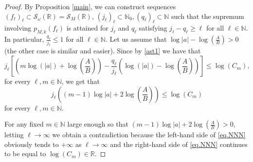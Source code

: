 \documentclass[12pt,reqno]{amsart} %
\numberwithin{equation}{section}
\begin{document}
\begin{proof}
					By Proposition \eqref{main}, we can construct sequences $(f_\ell)_\ell\subset \mathcal{S}_{\omega}(\mathbb{R})=\mathcal{S}_M(\mathbb{R})$, $(j_\ell)_\ell\subset \mathbb{N}_0, (q_\ell)_\ell\subset\mathbb{N}$ such that the supremum involving $p_{M,k}(f_\ell)$ is attained for $j_\ell$ and $q_\ell$ satisfying $j_\ell-q_\ell\geq \ell$ for all $\ell\in\mathbb{N}$. In particular, $\frac{q_\ell}{j_\ell}\leq 1$ for all $\ell\in\mathbb{N}$. Let us assume that $\log|a|-\log\left(\frac{A}{B}\right)>0$ (the other case is similar and easier).
					Since by \eqref{ast1} we have that
					\begin{equation*}\label{astint}
						j_{\ell}\left[\left(m\log(|a|)+\log\left(\frac{A}{B}\right)\right)-\frac{q_{\ell}}{j_{\ell}}\left(\log(|a|)-\log\left(\frac{A}{B}\right)\right)\right]\leq \log(C_m),
					\end{equation*}
					for every $\ell, m\in\mathbb{N}$,  we get that
					\begin{equation}\label{eq.NNN}
		j_{\ell}\left((m-1)\log|a|+2\log\left(\frac{A}{B}\right)\right)\leq \log(C_m)
					\end{equation}
				for every $\ell, m\in\mathbb{N}$. 
					
					
					 For any fixed $m\in\mathbb{N}$ large enough so that $(m -
					 1) \log |a| + 2\log\left(\frac{A}{B}\right)>0$, letting $\ell\to\infty$ we obtain  a contradiction because the left-hand side of  \eqref{eq.NNN} obviously tends to $+\infty$ as $\ell\to \infty$ and the right-hand side of  \eqref{eq.NNN} continues to be equal to $\log(C_m)\in\mathbb{R}$.
				\end{proof}
				
			
				
			
				
\end{document}

